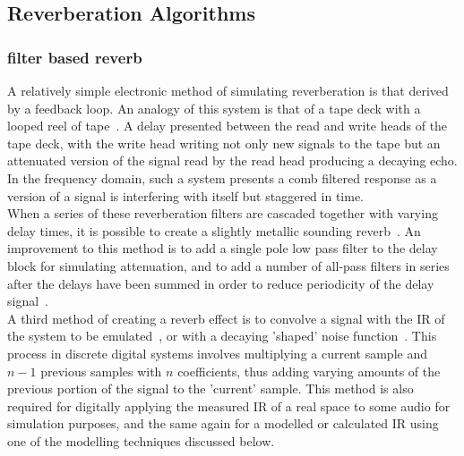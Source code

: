 \documentclass{svproc}
\begin{document}

\subsection{Reverberation Algorithms}
\subsubsection{filter based reverb}

A relatively simple electronic method of simulating reverberation is that derived by a feedback loop. An analogy of this system is that of a tape deck with a looped reel of tape~\cite{Begault1995}. A delay presented between the read and write heads of the tape deck, with the write head writing not only new signals to the tape but an attenuated version of the signal read by the read head producing a decaying echo. In the frequency domain, such a system presents a comb filtered response as a version of a signal is interfering with itself but staggered in time.\\ 
When a series of these reverberation filters are cascaded together with varying delay times, it is possible to create a slightly metallic sounding reverb~\cite{Begault1995}. An improvement to this method is to add a single pole low pass filter to the delay block for simulating attenuation, and to add  a number of all-pass filters in series after the delays have been summed in order to reduce periodicity of the delay signal~\cite{Logan1961}.\\


A third method of creating a reverb effect is to convolve a signal with the IR of the system to be emulated~\cite{Lee2010}, or with a decaying 'shaped' noise function~\cite{Lien2016}. This process in discrete digital systems involves multiplying a current sample and $n-1$ previous samples with $n$ coefficients, thus adding varying amounts of the previous portion of the signal to the 'current' sample. This method is also required for digitally applying the measured IR of a real space to some audio for simulation purposes, and the same again for a modelled or calculated IR using one of the modelling techniques discussed below. 
\end{document}
